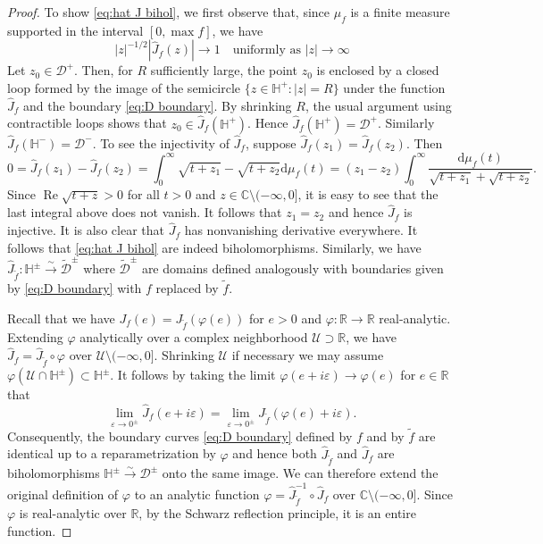 \documentclass[10pt,a4paper]{amsart}
\newcommand{\CD}{\mathcal{D}}
\newcommand{\CU}{\mathcal{U}}
\newcommand{\C}{\mathbb{C}}
\newcommand{\R}{\mathbb{R}}
\newcommand{\dif}{\mathrm{d}}
\newcommand{\inv}{^{-1}}
\newcommand{\wh}{\widehat}
\newcommand{\wt}{\widetilde}
\renewcommand{\Re}{\operatorname{Re}}
\renewcommand{\epsilon}{\varepsilon}
\begin{document}
\begin{proof}
	To show \eqref{eq:hat J bihol}, we first observe that, since $\mu_f$ is a finite measure supported in the interval $[0, \max f]$, we have 
	\begin{equation}\label{eq:hat J asymptotic}
		|z|^{-1/2} |\wh J_f(z)|\to 1 \quad \text{uniformly as $|z| \to \infty$}
	\end{equation}
	Let $z_0 \in \CD^+$.
	Then, for $R$ sufficiently large, the point $z_0$ is enclosed by a closed loop formed by the image of the semicircle $\{z \in \mathbb{H}^+ : |z| = R\}$ under the function $\wh J_f$ and the boundary \eqref{eq:D boundary}.
	By shrinking $R$, the usual argument using contractible loops shows that $z_0 \in \wh J_f(\mathbb{H}^+)$. Hence $\wh J_f(\mathbb{H}^+) = \CD^+$.
	Similarly $\wh J_f(\mathbb{H}^-) = \CD^-$.
	To see the injectivity of $\wh J_f$, suppose $\wh J_f(z_1) = \wh J_f(z_2)$. Then
	\begin{equation*}
		0 = \wh J_f(z_1) -  \wh J_f(z_2) = \int_0^\infty \sqrt{t + z_1} - \sqrt{t + z_2} \dif \mu_f(t) = (z_1 - z_2) \int_0^\infty \frac{\dif \mu_f(t)}{\sqrt{t + z_1} + \sqrt{t + z_2}}.
	\end{equation*}
	Since $\Re \sqrt{t + z} > 0$ for all $t > 0$ and $z \in \C \setminus (-\infty, 0]$, it is easy to see that the last integral above does not vanish. It follows that $z_1 = z_2$ and hence $\wh J_f$ is injective.
	It is also clear that $\wh J_f$ has nonvanishing derivative everywhere. It follows that \eqref{eq:hat J bihol} are indeed biholomorphisms.
	Similarly, we have $\wh J_{\wt f}: \mathbb{H}^\pm \xrightarrow{\sim} \wt{\CD}^\pm$ where $\wt{\CD}^\pm$ are domains defined analogously with boundaries given by \eqref{eq:D boundary} with $f$ replaced by $\wt f$.
	
\medskip

	Recall that we have $J_f(e) = J_{\wt f}(\varphi(e))$ for $e > 0$ and $\varphi: \R \to \R$ real-analytic.
	Extending $\varphi$ analytically over a complex neighborhood $\CU \supset \R$, we have $\wh J_f = \wh J_{\wt f} \circ \varphi$ over $\CU \setminus (-\infty, 0]$.
	Shrinking $\CU$ if necessary we may assume $\varphi(\CU \cap \mathbb{H}^\pm) \subset \mathbb{H}^\pm$.
	It follows by taking the limit $\varphi(e + i \epsilon)\to \varphi(e)$ for $e \in \R$ that 
	\begin{equation*}		\lim_{\epsilon \to 0^\pm} \wh J_f(e + i \epsilon) = \lim_{\epsilon \to 0^\pm} \wh J_{\wt f}(\varphi(e) + i \epsilon).
	\end{equation*}
	Consequently, the boundary curves \eqref{eq:D boundary} defined by $f$ and by $\wt f$ are identical up to a reparametrization by $\varphi$ and hence both $\wh J_{\wt f}$ and $\wh J_f$ are biholomorphisms $\mathbb{H}^\pm \xrightarrow{\sim} \CD^\pm$ onto the same image.
	We can therefore extend the original definition of $\varphi$ to an analytic function $\varphi = \wh J_{\wt f}\inv \circ \wh J_f$  over $\C\setminus (-\infty, 0]$.
	Since $\varphi$ is real-analytic over $\R$, by the Schwarz reflection principle, it is an entire function.


\end{proof}
\end{document}
